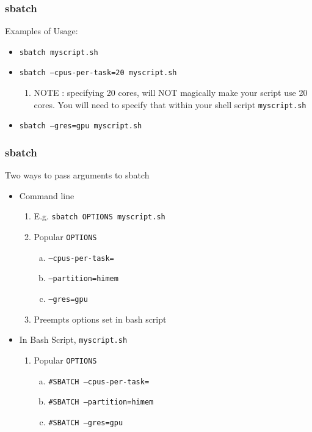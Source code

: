 \documentclass{beamer}
\newcommand{\code}[1]{\colorbox{codegray}{\texttt{#1}}}
\begin{document}
\begin{frame}
\frametitle{sbatch}
Examples of Usage:
\bigskip
\begin{itemize}
    \item \code{sbatch myscript.sh}
    \bigskip
    \pause
    \item \code{sbatch --cpus-per-task=20 myscript.sh}
    \bigskip
    \pause
    \begin{enumerate}
        \item NOTE : specifying 20 cores, will NOT magically make your script use 20 cores.
                     You will need to specify that within your shell script \code{myscript.sh}
    \end{enumerate}
    \pause
    \item \code{sbatch --gres=gpu myscript.sh}
    \bigskip
\end{itemize}
\end{frame}



\begin{frame}
\frametitle{sbatch}
Two ways to pass arguments to sbatch
\smallskip
\begin{itemize}
    \item Command line
        \smallskip
        \begin{enumerate}
            \item E.g. \code{sbatch OPTIONS myscript.sh}
            \pause
            \smallskip
            \item Popular \code{OPTIONS}
            \begin{enumerate}[a)]
                \item \code{--cpus-per-task=} 
                \pause
                \smallskip
                \item \code{--partition=himem}
                \pause
                \smallskip
                \item \code{--gres=gpu}
            \end{enumerate}
            \pause
            \smallskip
            \item Preempts options set in bash script
        \end{enumerate}
        \smallskip

    \pause
    \item In Bash Script, \code{myscript.sh}
        \smallskip
        \begin{enumerate}
            \item Popular \code{OPTIONS}
            \begin{enumerate}[a)]
                \item \code{\#SBATCH --cpus-per-task=} 
                \pause
                \smallskip
                \item \code{\#SBATCH --partition=himem}
                \pause
                \smallskip
                \item \code{\#SBATCH --gres=gpu}
            \end{enumerate}
        \end{enumerate}
\end{itemize}
\end{frame}
\end{document}
